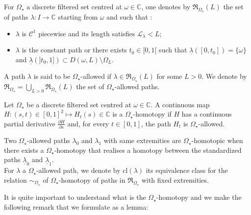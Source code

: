 \documentclass[11pt, english]{smfart}
\theoremstyle{definition}
\begin{document}
\begin{defi}\label{Allpath}
For $\Omega_\star$  a discrete filtered set centred at
$\omega \in \mathbb{C}$,
one denotes by $\mathfrak{R}_{\Omega_\star}(L)$ the set of paths  $\lambda : I \rightarrow
\mathbb{C}$ starting from $\omega$ and such that :
\begin{itemize}
\item $\lambda$ is  $\mathcal{C}^1$ piecewise and its  length satisfies 
$\mathcal{L}_\lambda <L$;
\item $\lambda$ is the constant path or there exists $t_0 \in [0,1[$
  such that  $\underline{\lambda}([0,t_0])=\{ \omega
  \}$ and $\underline{\lambda}(]t_0,1]) \subset D(\omega,L) \setminus \Omega_{L}$.
\end{itemize}
A path $\lambda$ is said to be $\Omega_\star$-allowed if $\lambda \in
\mathfrak{R}_{\Omega_\star}(L)$ for some $L>0$.
We denote by ${ \mathfrak{R}_{\Omega_\star} = \bigcup_{L>0}
\mathfrak{R}_{\Omega_\star}(L) }$ the set of $\Omega_\star$-allowed paths.
\end{defi}

\begin{defi}\label{Allhomotopy}
Let  $\Omega_\star$ be a discrete filtered set centred at
$\omega \in \mathbb{C}$. A continuous map
$\displaystyle H : (s,t) \in  [0,1]^2 \mapsto H_t(s) \in \mathbb{C}$
is a $\Omega_\star$-homotopy if $H$ has 
a continuous partial derivative $\displaystyle \frac{\partial
H}{ \partial s}$ and, for every $t \in [0,1]$, the
path $H_t$ is $\Omega_\star$-allowed.

Two $\Omega_\star$-allowed paths $\lambda_0$ and $\lambda_1$ with same
extremities are $\Omega_\star$-homotopic
when there exists a $\Omega_\star$-homotopy that realises a homotopy
between the standardized paths 
$\underline{\lambda}_0$ and  $\underline{\lambda}_1$.\\
For $\lambda$ a $\Omega_\star$-allowed path, we denote by $\mathrm{cl}(\lambda)$ its
equivalence class for the relation $\sim_{\Omega_\star}$ of  
$\Omega_\star$-homotopy  of paths in  $\mathfrak{R}_{\Omega_\star}$ with fixed
extremities.
\end{defi}

It is quite important to understand what is the
$\Omega_\star$-homotopy and we make the following remark that we
formulate as a lemma:
\end{document}
